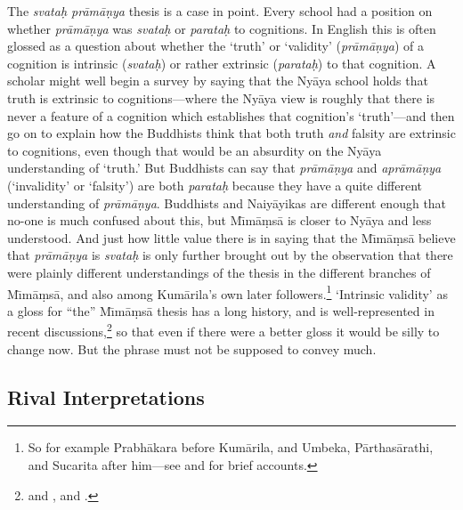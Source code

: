 ﻿\documentclass[11pt]{amsart}
\begin{document}
The \emph{svata\d h pr\=am\=a\d nya} thesis is a case in point. Every school had a position on whether \emph{pr\=am\=a\d nya} was \emph{svata\d h} or \emph{parata\d h} to cognitions. In English this is often glossed as a question about whether the `truth' or `validity' (\emph{pr\=am\=a\d nya}) of a cognition is intrinsic (\emph{svata\d h}) or rather extrinsic (\emph{parata\d h}) to that cognition. A scholar might well begin a survey by saying that the Ny\=aya school holds that truth is extrinsic to cognitions---where the Ny\=aya view is roughly that there is never a feature of a cognition which establishes that cognition's `truth'---and then go on to explain how the Buddhists think that both truth \emph{and} falsity are extrinsic to cognitions, even though that would be an absurdity on the Ny\=aya understanding of `truth.' But Buddhists can say that \emph{pr\=am\=a\d nya} and \emph{apr\=am\=a\d nya} (`invalidity' or `falsity') are both \emph{parata\d h} because they have a quite different understanding of \emph{pr\=am\=a\d nya}. Buddhists and Naiy\=ayikas are different enough that no-one is much confused about this, but M\={\i}m\=a\d ms\=a is closer to Ny\=aya and less understood. And just how little value there is in saying that the M\={\i}m\=a\d ms\=a believe that \emph{pr\=am\=a\d nya} is \emph{svata\d h} is only further brought out by the observation that there were plainly different understandings of the thesis in the different branches of M\={\i}m\=a\d ms\=a, and also among Kum\=arila's own later followers.\footnote{So for example Prabh\=akara before Kum\=arila, and Umbeka, P\=arthas\=arathi, and Sucarita after him---see \citet{chatterjea2003svatah} and \citet{taber1992dkb} for brief accounts.} `Intrinsic validity' as a gloss for ``the'' M\={\i}m\=a\d ms\=a thesis has a long history, and is well-represented in recent discussions,\footnote{\citet{keith1921karma} and \citet{radhakrishnan1927indian}, \citet{taber1992dkb} and \citet{arnold2001ivr}.} so that even if there were a better gloss it would be silly to change now. But the phrase must not be supposed to convey much.

\subsection{Rival Interpretations} \label{rivalinterpretations}
\end{document}

